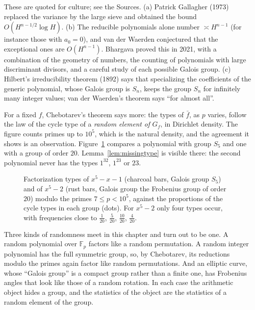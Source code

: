 \begin{remark}
These are quoted for culture; see the Sources. (a) Patrick Gallagher (1973) replaced the variance by the large sieve and obtained the bound $O(H^{n-1/2}\log H)$. (b) The reducible polynomials alone number $\asymp H^{n-1}$ (for instance those with $a_0=0$), and van der Waerden conjectured that the exceptional ones are $O(H^{n-1})$. Bhargava proved this in 2021, with a combination of the geometry of numbers, the counting of polynomials with large discriminant divisors, and a careful study of each possible Galois group. (c) Hilbert's irreducibility theorem (1892) says that specializing the coefficients of the generic polynomial, whose Galois group is $S_n$, keeps the group $S_n$ for infinitely many integer values; van der Waerden's theorem says ``for almost all''.
\end{remark}

For a fixed $f$, Chebotarev's theorem says more: the types of $\bar f$, as $p$ varies, follow the law of the cycle type of a \emph{random element of $G_f$}, in Dirichlet density. The figure counts primes up to $10^5$, which is the natural density, and the agreement it shows is an observation. Figure~\ref{fig:chebotarev} compares a polynomial with group $S_5$ and one with a group of order $20$. Lemma~\ref{lem:missingtype} is visible there: the second polynomial never has the types $1^32$, $1^23$ or $23$.

\begin{figure}[ht]
\centering{}
\caption{Factorization types of $x^5-x-1$ (charcoal bars, Galois group $S_5$) and of $x^5-2$ (rust bars, Galois group the Frobenius group of order $20$) modulo the primes $7\le p<10^5$, against the proportions of the cycle types in each group (dots). For $x^5-2$ only four types occur, with frequencies close to $\frac1{20}$, $\frac5{20}$, $\frac{10}{20}$, $\frac4{20}$.}
\label{fig:chebotarev}
\end{figure}

\begin{beauty}
Three kinds of randomness meet in this chapter and turn out to be one. A random polynomial over $\mathbb F_p$ factors like a random permutation. A random integer polynomial has the full symmetric group, so, by Chebotarev, its reductions modulo the primes again factor like random permutations. And an elliptic curve, whose ``Galois group'' is a compact group rather than a finite one, has Frobenius angles that look like those of a random rotation. In each case the arithmetic object hides a group, and the statistics of the object are the statistics of a random element of the group.
\end{beauty}

